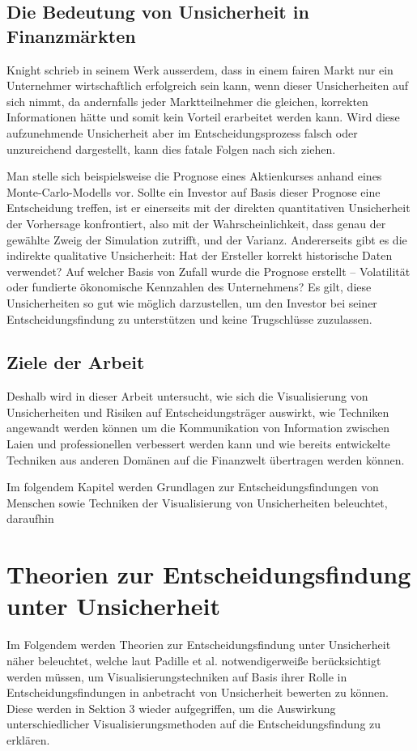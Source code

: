 \subsection{Die Bedeutung von Unsicherheit in Finanzmärkten}
Knight schrieb in seinem Werk ausserdem, dass in einem fairen Markt nur ein Unternehmer wirtschaftlich erfolgreich
sein kann, wenn dieser Unsicherheiten auf sich nimmt, da andernfalls jeder Marktteilnehmer die gleichen, korrekten 
Informationen hätte und somit kein Vorteil erarbeitet werden kann.
Wird diese aufzunehmende Unsicherheit aber im Entscheidungsprozess falsch oder unzureichend dargestellt, kann dies fatale Folgen nach sich 
ziehen. 

Man stelle sich beispielsweise die Prognose eines Aktienkurses anhand eines Monte-Carlo-Modells vor. Sollte ein Investor auf Basis 
dieser Prognose eine Entscheidung treffen, ist er einerseits mit der direkten quantitativen Unsicherheit der Vorhersage konfrontiert, 
also mit der Wahrscheinlichkeit, dass genau der gewählte Zweig der Simulation zutrifft, und der Varianz. Andererseits gibt es die 
indirekte qualitative Unsicherheit: Hat der Ersteller korrekt historische Daten verwendet? \cite{Padilla2021} Auf welcher Basis von Zufall wurde die Prognose erstellt –
Volatilität oder fundierte ökonomische Kennzahlen des Unternehmens? Es gilt, diese Unsicherheiten so gut wie möglich darzustellen, 
um den Investor bei seiner Entscheidungsfindung zu unterstützen und keine Trugschlüsse zuzulassen.

\subsection{Ziele der Arbeit}
Deshalb wird in dieser Arbeit untersucht, wie sich die Visualisierung von Unsicherheiten und Risiken auf Entscheidungsträger auswirkt, wie Techniken angewandt werden können um 
die Kommunikation von Information zwischen Laien und professionellen verbessert werden kann und wie bereits entwickelte Techniken aus anderen Domänen auf die Finanzwelt übertragen werden können.

Im folgendem Kapitel werden Grundlagen zur Entscheidungsfindungen von Menschen sowie Techniken der Visualisierung von Unsicherheiten beleuchtet,
daraufhin


\section{Theorien zur Entscheidungsfindung unter Unsicherheit}
Im Folgendem werden Theorien zur Entscheidungsfindung unter Unsicherheit näher beleuchtet, welche laut Padille et al. notwendigerweiße berücksichtigt
werden müssen, um Visualisierungstechniken auf Basis ihrer Rolle in Entscheidungsfindungen in anbetracht von Unsicherheit bewerten zu können. Diese 
werden in Sektion 3 wieder aufgegriffen, um die Auswirkung unterschiedlicher Visualisierungsmethoden auf die Entscheidungsfindung zu erklären. \cite{VisualizationPsychology2023}

